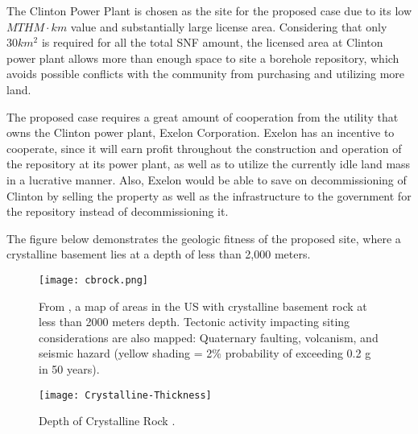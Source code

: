 
The Clinton Power Plant is chosen as the site for the proposed case due to its
low $MTHM\cdot km$ value and substantially large license area\cite{NRC_Clinton}.
 Considering that only
 $30km^2$ is required for all the total \gls{SNF} amount, the licensed area at Clinton
  power plant allows more than  enough space to site a borehole repository, which
   avoids possible conflicts with the community from purchasing and utilizing more
    land. 
  
  The proposed case requires a great amount of cooperation from the utility that owns
  the Clinton power plant, Exelon Corporation. 
  Exelon has an incentive to cooperate,
  since it will earn profit throughout the construction and operation of the 
  repository at its power plant, as well as to utilize the currently idle land mass
  in a lucrative manner. Also, Exelon would be able to save on decommissioning of
  Clinton by selling the property as well as the infrastructure to the government 
  for the repository instead of decommissioning it.  
  
  
  
  The figure below demonstrates the geologic fitness of the proposed site, where 
  a crystalline basement lies at a depth of less than 2,000 meters.



\begin{figure}[!h] 
  \centering
  \texttt{[image: cbrock.png]}	
        \caption{From \cite{Perry_2015}, a map of areas in the US with 
        crystalline basement rock at less than 2000 meters depth. Tectonic 
        activity impacting siting considerations are also mapped:  Quaternary 
        faulting, volcanism, and seismic hazard (yellow shading = 2\% 
        probability of exceeding 0.2 g in 50 years).}
  \label{fig:cbrock}
\end{figure}

  
  \iffalse

\begin{figure}[!h] 
  \centering
  \texttt{[image: Crystalline-Thickness]}	
  \caption{Depth of Crystalline Rock
  \cite{Perry_2015}.}
  \label{fig:Depth}
\end{figure}

